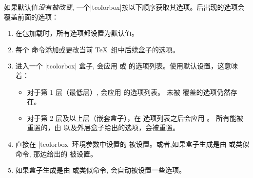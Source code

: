 如果默认值\emph{没有被改变}, 一个|tcolorbox|按以下顺序获取其选项。后出现的选项会覆盖前面的选项：


\begin{enumerate}
\item %
在包加载时，所有选项都设置为默认值。
\item %
每个  命令添加或更改当前 \TeX\ 组中后续盒子的选项。
\item 

进入一个 |tcolorbox| 盒子, 会应用  或   的选项列表。使用默认设置，这意味着：
\begin{itemize}
\item %
对于第 1 层（最低层）, 会应用  的选项列表。%
未被  覆盖的选项仍然存在。
\item 
对于第 2 层及以上层（嵌套盒子），在  选项列表之后会应用 。 所有能被重置的，由  以及外层盒子给出的选项，会被重置。
\end{itemize}
\item 
直接在 |tcolorbox| 环境参数中设置的  被设置。或者,如果盒子生成是由  或类似命令, 那边给出的  被设置。
\item 
如果盒子生成是由  或类似命令, 会自动被设置一些选项。
\end{enumerate}


